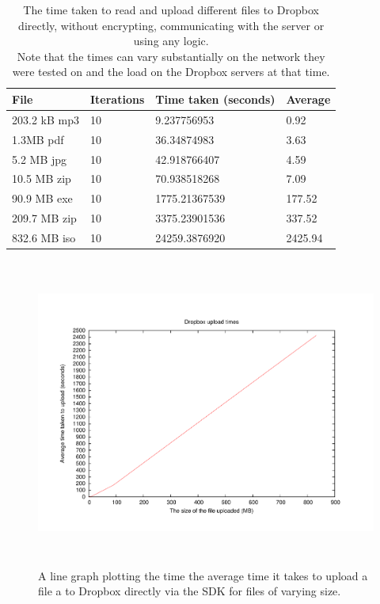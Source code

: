 \documentclass[12pt, titlepage]{article}
\begin{document}
\begin{table}[h!]
\begin{center}
    \begin{tabular}{ | l | l | l | l |}
    \hline
    \textbf{File} & \textbf{Iterations} & \textbf{Time taken (seconds)} & \textbf{Average} \\ \hline
    
    203.2 kB mp3 & 10 & 9.237756953 & 0.92 \\ \hline
    1.3MB pdf & 10 & 36.34874983 & 3.63 \\ \hline
	5.2 MB jpg & 10 & 42.918766407 & 4.59 \\ \hline
    10.5 MB zip & 10 & 70.938518268 & 7.09 \\ \hline
    90.9 MB exe & 10 & 1775.21367539  & 177.52 \\ \hline
    209.7 MB zip & 10 & 3375.23901536 & 337.52 \\ \hline
    832.6 MB iso & 10 & 24259.3876920 & 2425.94 \\ \hline
    \end{tabular}
    \caption{The time taken to read and upload different files to Dropbox directly, without encrypting, communicating with the server or using any logic. \\ Note that the times can vary substantially on the network they were tested on and the load on the Dropbox servers at that time.} \label{tab:uploadDropboxBenchmark}
    \end{center}
\end{table}

\begin{figure}[!t]
\centerline{\includegraphics[height=4.0in,width=7in,angle=0]{plots/dropboxUpload/dropboxUploadTimes.pdf}}
\caption{A line graph plotting the time the average time it takes to upload a file a to Dropbox directly via the SDK for files of varying size.}
\label{fig:dropboxUploadLineGraph}
\end{figure}
\end{document}
